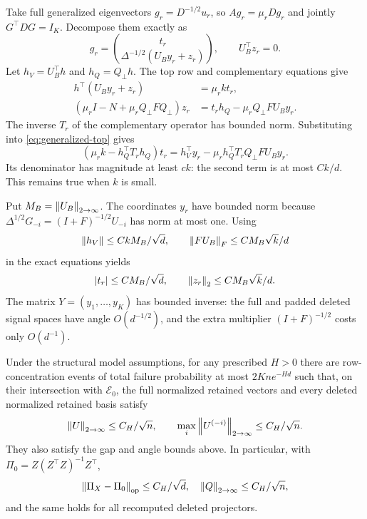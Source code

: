 Take full generalized eigenvectors $g_r=D^{-1/2}u_r$, so
$Ag_r=\mu_rDg_r$ and jointly $G^\top DG=I_K$.
Decompose them exactly as
\[
 g_r=\binom{t_r}{\Delta^{-1/2}(U_By_r+z_r)},
 \qquad U_B^\top z_r=0.
\]
Let $h_V=U_B^\top h$ and $h_Q=Q_\perp h$.
The top row and complementary equations give
\begin{align}
 h^\top(U_By_r+z_r)&=\mu_r k t_r,\label{eq:generalized-top}\\
 (\mu_rI-N+\mu_rQ_\perp FQ_\perp)z_r
   &=t_rh_Q-\mu_rQ_\perp FU_By_r.\label{eq:generalized-complement}
\end{align}
The inverse $T_r$ of the complementary operator has bounded norm.
Substituting into \eqref{eq:generalized-top} gives
\begin{equation}\label{eq:top-resolvent}
 (\mu_r k-h_Q^\top T_rh_Q)t_r
 =h_V^\top y_r-\mu_rh_Q^\top T_rQ_\perp FU_By_r.
\end{equation}
Its denominator has magnitude at least $ck$: the second term is at most
$Ck/d$. This remains true when $k$ is small.

Put $M_B=\left\lVert U_B\right\rVert_{2\to\infty}$.
The coordinates $y_r$ have bounded norm because
$\Delta^{1/2}G_{-i}=(I+F)^{-1/2}U_{-i}$ has norm at most one.
Using
\[
 \left\lVert h_V\right\rVert\le CkM_B/\sqrt d,\qquad
 \left\lVert FU_B\right\rVert_F\le CM_B\sqrt k/d
\]
in the exact equations yields
\begin{equation}\label{eq:generalized-bounds}
 |t_r|\le CM_B/\sqrt d,\qquad
 \left\lVert z_r\right\rVert_2\le CM_B\sqrt k/d.
\end{equation}
The matrix $Y=(y_1,\ldots,y_K)$ has bounded inverse: the full and padded
deleted signal spaces have angle $O(d^{-1/2})$, and the extra multiplier
$(I+F)^{-1/2}$ costs only $O(d^{-1})$.

\begin{lemma}\label{lem:normalized-rows}
Under the structural model assumptions, for any prescribed $H>0$ there
are row-concentration events of total failure probability at most
$2Kn e^{-Hd}$ such that, on their intersection with $\mathcal E_0$,
the full normalized retained vectors and every deleted normalized retained
basis satisfy
\begin{equation}\label{eq:row-incoherence}
 \left\lVert U\right\rVert_{2\to\infty}\le C_H/\sqrt n,
 \qquad \max_i\left\lVert U^{(-i)}\right\rVert_{2\to\infty}\le C_H/\sqrt n.
\end{equation}
They also satisfy the gap and angle bounds above. In particular, with
$\Pi_0=Z(Z^\top Z)^{-1}Z^\top$,
\begin{equation}\label{eq:euclidean-angle}
 \left\lVert\Pi_X-\Pi_0\right\rVert_{\mathrm{op}}\le C_H/\sqrt d,
 \quad \left\lVert Q\right\rVert_{2\to\infty}\le C_H/\sqrt n,
\end{equation}
and the same holds for all recomputed deleted projectors.
\end{lemma}

